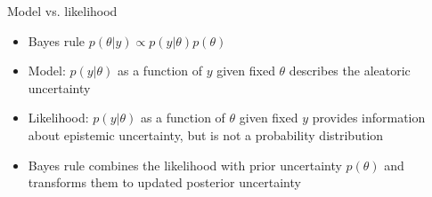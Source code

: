 \documentclass[english,t]{beamer}
\begin{document}


\begin{frame}{Model vs. likelihood}

  \begin{itemize}
  \item Bayes rule
      $p(\theta|y)\propto p(y|\theta)p(\theta)$
    \vspace{\baselineskip}
  \item Model: $p(y|\theta)$ as a function of $y$ given fixed $\theta$
    describes the aleatoric uncertainty \vspace{\baselineskip}
  \item Likelihood: $p(y|\theta)$ %
    as a function of $\theta$
    given fixed $y$ provides information about epistemic uncertainty,
    but is not a probability distribution
    \vspace{\baselineskip}
  \item<2-> Bayes rule combines the likelihood with prior uncertainty
    $p(\theta)$ and transforms them to updated posterior uncertainty
  \end{itemize}
\end{frame}
\end{document}
